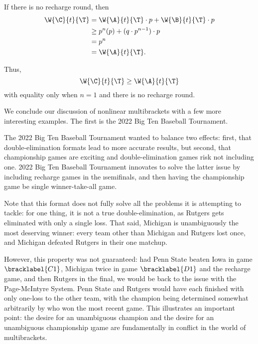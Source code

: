 {{        If there is no recharge round, then
        \begin{align*}
            \W{\C}{t}{\T} &= \W{\A}{t}{\T} \cdot p + \W{\B}{t}{\T} \cdot p\\
            &\geq p^n(p) + (q \cdot p^{n-1}) \cdot p\\
            &= p^n\\
            &= \W{\A}{t}{\T}.
        \end{align*}

        Thus, $$\W{\C}{t}{\T} \geq \W{\A}{t}{\T}$$ with equality only when $n=1$ and there is no recharge round.
    }{}

    We conclude our discussion of nonlinear multibrackets with a few more interesting examples. The first is the 2022 Big Ten Baseball Tournament.


    The 2022 Big Ten Baseball Tournament wanted to balance two effects: first, that double-elimination formats lead to more accurate results, but second, that championship games are exciting and double-elimination games risk not including one. 2022 Big Ten Baseball Tournament innovates to solve the latter issue by including recharge games in the \i{semifinals}, and then having the championship game be single winner-take-all game.

    Note that this format does not fully solve all the problems it is attempting to tackle: for one thing, it is not a true double-elimination, as Rutgers gets eliminated with only a single loss. That said, Michigan is unambiguously the most deserving winner: every team other than Michigan and Rutgers lost once, and Michigan defeated Rutgers in their one matchup.
    
    However, this property was not guaranteed: had Penn State beaten Iowa in game $\bracklabel{C1}$, Michigan twice in game $\bracklabel{D1}$ and the recharge game, and then Rutgers in the final, we would be back to the issue with the Page-McIntyre System. Penn State and Rutgers would have each finished with only one-loss to the other team, with the champion being determined somewhat arbitrarily by who won the most recent game. This illustrates an important point: the desire for an unambiguous champion and the desire for an unambiguous championship \i{game} are fundamentally in conflict in the world of multibrackets.

}
